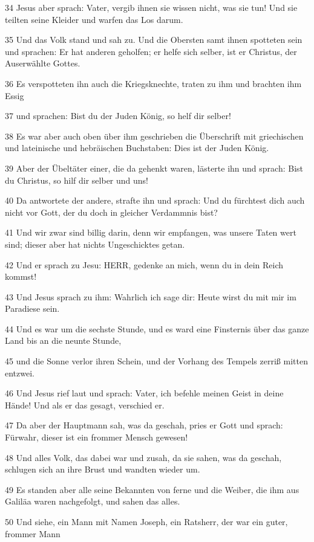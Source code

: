 \par 34 Jesus aber sprach: Vater, vergib ihnen sie wissen nicht, was sie tun! Und sie teilten seine Kleider und warfen das Los darum.
\par 35 Und das Volk stand und sah zu. Und die Obersten samt ihnen spotteten sein und sprachen: Er hat anderen geholfen; er helfe sich selber, ist er Christus, der Auserwählte Gottes.
\par 36 Es verspotteten ihn auch die Kriegsknechte, traten zu ihm und brachten ihm Essig
\par 37 und sprachen: Bist du der Juden König, so helf dir selber!
\par 38 Es war aber auch oben über ihm geschrieben die Überschrift mit griechischen und lateinische und hebräischen Buchstaben: Dies ist der Juden König.
\par 39 Aber der Übeltäter einer, die da gehenkt waren, lästerte ihn und sprach: Bist du Christus, so hilf dir selber und uns!
\par 40 Da antwortete der andere, strafte ihn und sprach: Und du fürchtest dich auch nicht vor Gott, der du doch in gleicher Verdammnis bist?
\par 41 Und wir zwar sind billig darin, denn wir empfangen, was unsere Taten wert sind; dieser aber hat nichts Ungeschicktes getan.
\par 42 Und er sprach zu Jesu: HERR, gedenke an mich, wenn du in dein Reich kommst!
\par 43 Und Jesus sprach zu ihm: Wahrlich ich sage dir: Heute wirst du mit mir im Paradiese sein.
\par 44 Und es war um die sechste Stunde, und es ward eine Finsternis über das ganze Land bis an die neunte Stunde,
\par 45 und die Sonne verlor ihren Schein, und der Vorhang des Tempels zerriß mitten entzwei.
\par 46 Und Jesus rief laut und sprach: Vater, ich befehle meinen Geist in deine Hände! Und als er das gesagt, verschied er.
\par 47 Da aber der Hauptmann sah, was da geschah, pries er Gott und sprach: Fürwahr, dieser ist ein frommer Mensch gewesen!
\par 48 Und alles Volk, das dabei war und zusah, da sie sahen, was da geschah, schlugen sich an ihre Brust und wandten wieder um.
\par 49 Es standen aber alle seine Bekannten von ferne und die Weiber, die ihm aus Galiläa waren nachgefolgt, und sahen das alles.
\par 50 Und siehe, ein Mann mit Namen Joseph, ein Ratsherr, der war ein guter, frommer Mann
